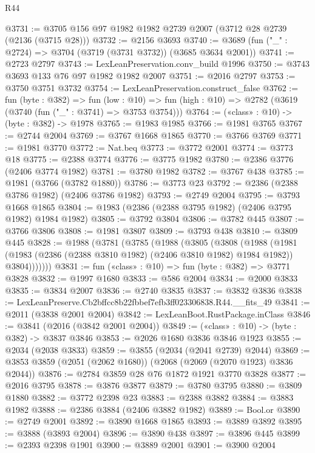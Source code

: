 \begin{lexlean}{R44}
\begin{coremodule}
@3731 := @3705 @156 @97 @1982 @1982 @2739 @2007 (@3712 @28 @2739 (@2136 (@3715 @28)))
@3732 := @2156 @3693
@3740 := @3689 (fun ("_" : @2724) => @3704 (@3719 (@3731 @3732)) (@3685 @3634 @2001))
@3741 := @2723 @2797
@3743 := LexLeanPreservation.conv_build @1996
@3750 := @3743 @3693 @133 @76 @97 @1982 @1982 @2007
@3751 := @2016 @2797
@3753 := @3750 @3751 @3732
@3754 := LexLeanPreservation.construct_false
@3762 := fun (byte : @382) =>
  fun (low : @10) => fun (high : @10) => @2782 (@3619 (@3740 (fun ("_" : @3741) => @3753 @3754)))
@3764 := («class» : @10) -> (byte : @382) -> @1978
@3765 := @1983 @1985
@3766 := @1981 @3765
@3767 := @2744 @2004
@3769 := @3767 @1668 @1865
@3770 := @3766 @3769
@3771 := @1981 @3770
@3772 := Nat.beq
@3773 := @3772 @2001
@3774 := @3773 @18
@3775 := @2388 @3774
@3776 := @3775 @1982
@3780 := @2386 @3776 (@2406 @3774 @1982)
@3781 := @3780 @1982
@3782 := @3767 @438
@3785 := @1981 (@3766 (@3782 @1880))
@3786 := @3773 @23
@3792 := @2386 (@2388 @3786 @1982) (@2406 @3786 @1982)
@3793 := @2749 @2004
@3795 := @3793 @1668 @1865
@3804 := @1983 (@2386 (@2388 @3795 @1982) (@2406 @3795 @1982) @1984 @1982)
@3805 := @3792 @3804
@3806 := @3782 @445
@3807 := @3766 @3806
@3808 := @1981 @3807
@3809 := @3793 @438
@3810 := @3809 @445
@3828 := @1988
    (@3781
      (@3785
        (@1988
          (@3805
            (@3808
              (@1988
                (@1981
                  (@1983 (@2386 (@2388 @3810 @1982) (@2406 @3810 @1982) @1984 @1982))
                  @3804)))))))
@3831 := fun («class» : @10) => fun (byte : @382) => @3771 @3828
@3832 := @1997 @1680
@3833 := @586 @2004
@3834 := @2000 @3833
@3835 := @3834 @2007
@3836 := @2740 @3835
@3837 := @3832 @3836
@3838 := LexLeanPreserve.Cb2bffcc8b22fbbef7efb3ff023306838.R44.__fits_49
@3841 := @2011 (@3838 @2001 @2004)
@3842 := LexLeanBoot.RustPackage.inClass
@3846 := @3841 (@2016 (@3842 @2001 @2004))
@3849 := («class» : @10) -> (byte : @382) -> @3837 @3846
@3853 := @2026 @1680 @3836 @3846 @1923
@3855 := @2034 (@2038 @3833)
@3859 := @3855 (@2034 (@2041 @2739) @2044)
@3869 := @3853 @3859 (@2051 (@2062 @1680)) (@2068 (@2069 (@2070 @1923) @3836 @2044))
@3876 := @2784 @3859 @28 @76 @1872 @1921 @3770 @3828
@3877 := @2016 @3795
@3878 := @3876 @3877
@3879 := @3780 @3795
@3880 := @3809 @1880
@3882 := @3772 @2398 @23
@3883 := @2388 @3882
@3884 := @3883 @1982
@3888 := @2386 @3884 (@2406 @3882 @1982)
@3889 := Bool.or
@3890 := @2749 @2001
@3892 := @3890 @1668 @1865
@3893 := @3889 @3892
@3895 := @3888 (@3893 @2004)
@3896 := @3890 @438
@3897 := @3896 @445
@3899 := @2393 @2398 @1901
@3900 := @3889 @2001
@3901 := @3900 @2004

\end{coremodule}
\end{lexlean}

